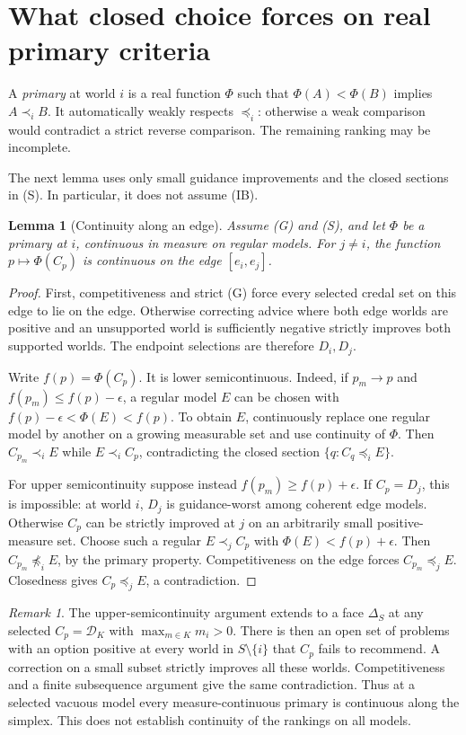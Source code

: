 \documentclass[11pt]{article}
\newtheorem{lemma}[theorem]{Lemma}
\theoremstyle{remark}\newtheorem{remark}[theorem]{Remark}
\newcommand{\Dscr}{\mathcal D}
\begin{document}
\section{What closed choice forces on real primary criteria}\label{sec:primary}

A \emph{primary} at world $i$ is a real function $\Phi$ such that
$\Phi(A)<\Phi(B)$ implies $A\prec_i B$. It automatically weakly respects
$\preceq_i$: otherwise a weak comparison would contradict a strict reverse
comparison. The remaining ranking may be incomplete.

The next lemma uses only small guidance improvements and the closed
sections in (S). In particular, it does not assume (IB).

\begin{lemma}[Continuity along an edge]\label{lem:edge-continuity}
Assume (G) and (S), and let $\Phi$ be a primary at $i$, continuous in measure
on regular models. For $j\ne i$, the function
$p\mapsto\Phi(C_p)$ is continuous on the edge $[e_i,e_j]$.
\end{lemma}
\begin{proof}
First, competitiveness and strict (G) force every selected credal set on
this edge to lie on the edge. Otherwise correcting advice where both edge
worlds are positive and an unsupported world is sufficiently negative
strictly improves both supported worlds. The endpoint selections are
therefore $D_i,D_j$.

Write $f(p)=\Phi(C_p)$. It is lower semicontinuous. Indeed, if
$p_m\to p$ and $f(p_m)\le f(p)-\epsilon$, a regular model $E$ can be chosen
with $f(p)-\epsilon<\Phi(E)<f(p)$. To obtain $E$, continuously replace one
regular model by another on a growing measurable set and use continuity
of $\Phi$. Then $C_{p_m}\prec_i E$ while $E\prec_i C_p$, contradicting the
closed section $\{q:C_q\preceq_i E\}$.

For upper semicontinuity suppose instead $f(p_m)\ge f(p)+\epsilon$.
If $C_p=D_j$, this is impossible: at world $i$, $D_j$ is guidance-worst
among coherent edge models. Otherwise $C_p$ can be strictly improved at
$j$ on an arbitrarily small positive-measure set. Choose such a regular
$E\prec_j C_p$ with $\Phi(E)<f(p)+\epsilon$.
Then $C_{p_m}\not\preceq_i E$, by the primary property. Competitiveness
on the edge forces $C_{p_m}\preceq_j E$. Closedness gives
$C_p\preceq_j E$, a contradiction.
\end{proof}

\begin{remark}
The upper-semicontinuity argument extends to a face $\Delta_S$ at any
selected $C_p=\Dscr_K$ with $\max_{m\in K}m_i>0$.
There is then an open set of problems with an option positive at every world
in $S\setminus\{i\}$ that $C_p$ fails to recommend.
A correction on a small subset strictly improves all these worlds.
Competitiveness and a finite subsequence argument give the same contradiction.
Thus at a selected vacuous model every measure-continuous primary is
continuous along the simplex. This does not establish continuity of the
rankings on all models.
\end{remark}
\end{document}
